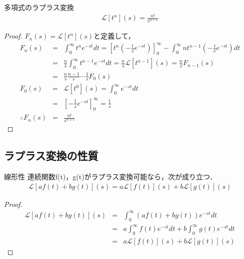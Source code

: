 \documentclass[uplatex, dvipdfmx, fleqn, a4paper, 10pt]{ujreport}
\begin{document}
\begin{exprbox}{多項式のラプラス変換}
    \begin{eqnarray}
        \mathcal{L}[t^n](s) = \frac{n!}{s^{n + 1}}
    \end{eqnarray}
    \begin{proof}
        $F_n(s) = \mathcal{L}[t^n](s)$と定義して，
        \begin{eqnarray*}
            F_n(s) &=& \int_{0}^{\infty} t^n e^{-st} dt
            = \left[t^n \left(-\frac{1}{s} e^{-st}\right)\right]_0^\infty - \int_{0}^{\infty} n t^{n - 1} \left(-\frac{1}{s} e^{-st}\right) dt \\
            &=& \frac{n}{s} \int_{0}^{\infty} t^{n - 1} e^{-st} dt = \frac{n}{s} \mathcal{L}[t^{n - 1}](s)
            = \frac{n}{s} F_{n - 1}(s) \\
            &=& \frac{n}{s} \frac{n - 1}{s} \cdots \frac{1}{s} F_0(s) \\
            F_0(s) &=& \mathcal{L}[t^0](s) = \int_{0}^{\infty} e^{-st} dt \\
            &=& \left[-\frac{1}{s}e^{-st}\right]_0^\infty = \frac{1}{s} \\
            \therefore F_n(s) &=& \frac{n!}{s^{n + 1}}
        \end{eqnarray*}
    \end{proof}
\end{exprbox}

\newpage

\subsection{ラプラス変換の性質}

\begin{exprbox}{線形性}
    連続関数f(t)，g(t)がラプラス変換可能なら，次が成り立つ．
    \begin{eqnarray}
        \mathcal{L}[a f(t) + b g(t)](s) = a\mathcal{L}[f(t)](s) + b\mathcal{L}[g(t)](s)
    \end{eqnarray}
    \begin{proof}
        \begin{eqnarray*}
            \mathcal{L}[a f(t) + b g(t)](s) &=& 
            \int_{0}^{\infty} \left(a f(t) + b g(t)\right) e^{-st} dt\\
            &=& a \int_{0}^{\infty} f(t) e^{-st} dt + b \int_{0}^{\infty} g(t) e^{-st} dt \\
            &=& a\mathcal{L}[f(t)](s) + b\mathcal{L}[g(t)](s)
        \end{eqnarray*}
    \end{proof}
\end{exprbox}
\end{document}

